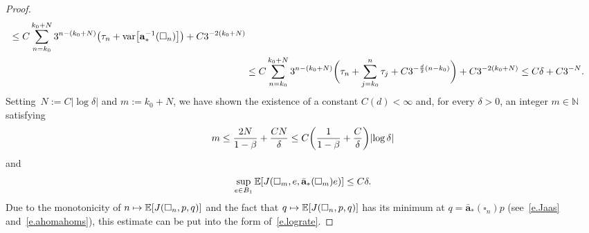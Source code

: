 \documentclass[11pt]{article} %
\let\oldsquare\square %
\renewcommand{\square}{\oldsquare}
\numberwithin{equation}{section}
\theoremstyle{definition}
\let\originalleft\left
\let\originalright\right
\renewcommand{\left}{\mathopen{}\mathclose\bgroup\originalleft}
\renewcommand{\right}{\aftergroup\egroup\originalright}
\newcommand*{\N}{\ensuremath{\mathbb{N}}}
\renewcommand{\a}{\mathbf{a}}
\newcommand{\ahom}{\bar{\a}}
\newcommand{\cu}{\square}
\newcommand{\E}{\mathbb{E}}
\DeclareMathOperator{\var}{var}
\begin{document}
\begin{proof}
\begin{align*}
\leq 
C 
\sum_{n=k_0}^{k_0+N} 3^{n - (k_0+N)} 
\left( \tau_n + \var\left[ \a_*^{-1}(\cu_n) \right] \right)
+C 3^{-2(k_0+N)}
\\ & 
\leq
C
\sum_{n=k_0}^{k_0+N} 3^{n - (k_0+N)} 
\biggl( \tau_n + 
\sum_{j=k_0}^n \tau_j + C 3^{-\frac d2(n-k_0)} 
\biggr)
+C 3^{-2(k_0+N)}
\leq 
C\delta + C3^{-N}.
\end{align*}
Setting~$N := C | \log \delta |$ and $m:=k_0+N$,
we have shown the existence of a constant $C(d)<\infty$ and, for every $\delta>0$, an integer $m \in\N$ satisfying
\begin{equation*}
m
\leq 
\frac{2 N}{1-\beta} 
+ 
\frac{C N}{\delta}
\leq 
C 
\left( \frac{1}{1-\beta} + \frac{C}{\delta} \right) 
\left| \log \delta \right|
\end{equation*}
and
\begin{equation*}
\sup_{e\in B_1 }
\E \left[ J(\cu_{m},e,\ahom_*(\cu_{m}) e) \right]
\leq C\delta. 
\end{equation*}
Due to the monotonicity of $n\mapsto \E \left[ J(\cu_{n},p,q) \right]$ and the fact that $q\mapsto  \E \left[ J(\cu_{n},p,q) \right]$ has its minimum at $q=\ahom_*(\cu_n)p$ (see~\eqref{e.Jaas} and~\eqref{e.ahomahoms}), this estimate can be put into the form of~\eqref{e.lograte}. 
\end{proof}
\end{document}

